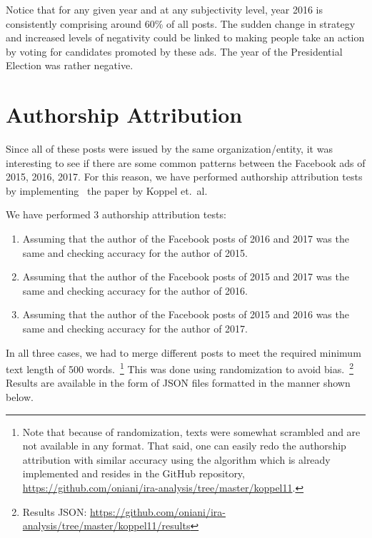 \documentclass[11pt]{article}
\begin{document}
Notice that for any given year and at any subjectivity level, year 2016 is
consistently comprising around 60\% of all posts. The sudden change in
strategy and increased levels of negativity could be linked to making people
take an action by voting for candidates promoted by these ads. The year of the
Presidential Election was rather negative.


\section*{\centering Authorship Attribution}

Since all of these posts were issued by the same organization/entity, it was
interesting to see if there are some common patterns between the Facebook ads
of 2015, 2016, 2017. For this reason, we have performed authorship attribution
tests by implementing~\cite{koppel11} the paper by Koppel et.~al.

\bigskip

We have performed 3 authorship attribution tests:

\begin{enumerate}
  \item Assuming that the author of the Facebook posts of 2016 and 2017 was the
        same and checking accuracy for the author of 2015.

  \item Assuming that the author of the Facebook posts of 2015 and 2017 was the
        same and checking accuracy for the author of 2016.

  \item Assuming that the author of the Facebook posts of 2015 and 2016 was the
        same and checking accuracy for the author of 2017.
\end{enumerate}

In all three cases, we had to merge different posts to meet the required
minimum text length of 500 words.~\footnote{Note that because of randomization,
texts were somewhat scrambled and are not available in any format. That said,
one can easily redo the authorship attribution with similar accuracy using the
algorithm which is already implemented and resides in the GitHub repository,
\url{https://github.com/oniani/ira-analysis/tree/master/koppel11}.} This was
done using randomization to avoid bias.~\footnote{Results JSON:
\url{https://github.com/oniani/ira-analysis/tree/master/koppel11/results}}
Results are available in the form of JSON files formatted in the manner shown
below.
\end{document}
